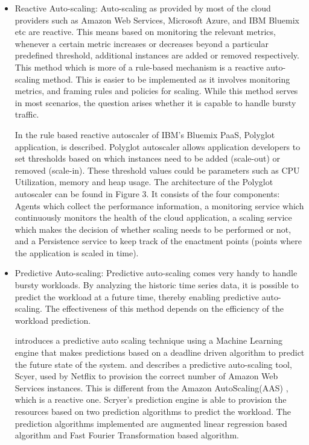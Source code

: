 \documentclass[article,type=msc,colorback,12pt,accentcolor=tud7b]{tudthesis}
\begin{document}
	\begin{itemize}
	
	\item{Reactive Auto-scaling: }Auto-scaling as provided by most of the cloud providers such as Amazon Web Services, Microsoft Azure, and IBM Bluemix etc are reactive. This means based on monitoring the relevant metrics, whenever a certain metric increases or decreases beyond a particular predefined threshold, additional instances are added or removed respectively. This method which is more of a rule-based mechanism is a reactive auto-scaling method. This is easier to be implemented as it involves monitoring metrics, and framing rules and policies for scaling. While this method serves in most scenarios, the question arises whether it is capable to handle bursty traffic.
	
	In \cite{seelam2015polyglot} the rule based reactive autoscaler of IBM's Bluemix PaaS, Polyglot application, is described. Polyglot autoscaler allows application developers to set thresholds based on which instances need to be added (scale-out) or removed (scale-in). These threshold values could be parameters such as CPU Utilization, memory and heap usage. The architecture of the Polyglot autoscaler can be found in Figure 3. It consists of the four components: Agents which collect the performance information, a monitoring service which continuously monitors the health of the cloud application, a scaling service which makes the decision of whether scaling needs to be performed or not, and a Persistence service to keep track of the enactment points (points where the application is scaled in time).  

\item{Predictive Auto-scaling: }Predictive auto-scaling comes very handy to handle bursty workloads. By analyzing the historic time series data, it is possible to predict the workload at a future time, thereby enabling predictive auto-scaling. The effectiveness of this method depends on the efficiency of the workload prediction.

\cite{biswas2015predictive} introduces a predictive auto scaling technique using a Machine Learning engine that makes predictions based on a deadline driven algorithm to predict the future state of the system. \cite{Scryer1} and \cite{Scryer2} describes a predictive auto-scaling tool, Scyer, used by Netflix to provision the correct number of Amazon Web Services \cite{aws} instances. This is different from the Amazon AutoScaling(AAS) \cite{aas}, which is a reactive one. Scryer's prediction engine is able to provision the resources based on two prediction algorithms to predict the workload. The prediction algorithms implemented are augmented linear regression based algorithm and Fast Fourier Transformation based algorithm.


\end{itemize}
\end{document}
